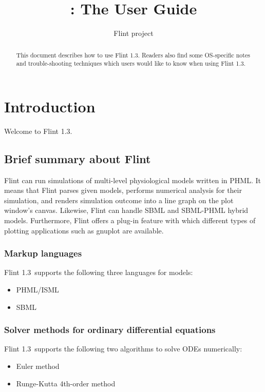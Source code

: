 \documentclass[a4paper,10pt]{report}
\title{\Flint: The User Guide}
\author{Flint project}
\def\FlintVersion{1.3}
\def\Flint{Flint \FlintVersion}
\begin{document}
\maketitle

\begin{abstract}
This document describes how to use \Flint.
Readers also find some OS-specific notes and trouble-shooting techniques which
users would like to know when using \Flint.
\end{abstract}

\tableofcontents



\chapter{Introduction}
Welcome to \Flint.

\section{Brief summary about Flint}
Flint can run simulations of multi-level physiological models written in PHML.
It means that Flint parses given models, performs numerical analysis for their
simulation, and renders simulation outcome into a line graph on the plot
window's canvas. Likewise, Flint can handle SBML and SBML-PHML hybrid models.
Furthermore, Flint offers a plug-in feature with which different types of
plotting applications such as gnuplot are available.

\subsection{Markup languages}
\Flint\ supports the following three languages for models:
\begin{itemize}
\item PHML/ISML
\item SBML
\end{itemize}

\subsection{Solver methods for ordinary differential equations}
\Flint\ supports the following two algorithms to solve ODEs numerically:
\begin{itemize}
\item Euler method
\item Runge-Kutta 4th-order method
\end{itemize}
\end{document}

